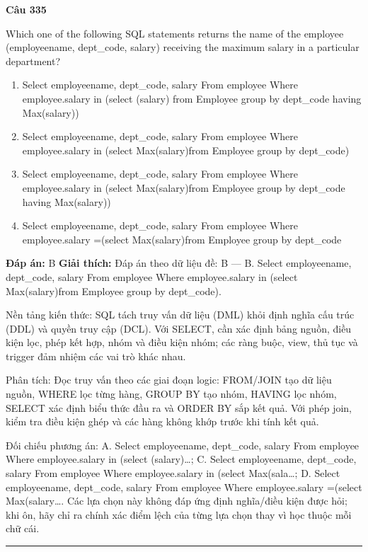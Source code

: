\documentclass[11pt,a4paper]{article}
\newenvironment{question}[1]{%
  \par\vspace{1em}\noindent\textbf{\large Câu #1}\par\vspace{0.4em}
}{%
  \par\vspace{1em}\hrule\vspace{0.6em}
}
\newenvironment{choices}{%
  \begin{enumerate}[label=\textbf{\Alph*.},leftmargin=2.2em,itemsep=2pt,topsep=3pt]
}{%
  \end{enumerate}
}
\newcommand{\choice}{\item}
\begin{document}
\begin{question}{335}
Which one of the following SQL statements returns the name of the employee (employeename, dept_code,
salary) receiving the maximum salary in a particular department?
\begin{choices}
\choice Select employeename, dept_code, salary From employee Where employee.salary in (select (salary) from Employee group by dept_code having Max(salary))
\choice Select employeename, dept_code, salary From employee Where employee.salary in (select Max(salary)from Employee group by dept_code)
\choice Select employeename, dept_code, salary From employee Where employee.salary in (select Max(salary)from Employee group by dept_code having Max(salary))
\choice Select employeename, dept_code, salary From employee Where employee.salary =(select Max(salary)from Employee group by dept_code
\end{choices}
\textbf{Đáp án:} B
\textbf{Giải thích:} Đáp án theo dữ liệu đề: B — B. Select employeename, dept_code, salary From employee Where employee.salary in (select Max(salary)from Employee group by dept_code).

Nền tảng kiến thức: SQL tách truy vấn dữ liệu (DML) khỏi định nghĩa cấu trúc (DDL) và quyền truy cập (DCL). Với SELECT, cần xác định bảng nguồn, điều kiện lọc, phép kết hợp, nhóm và điều kiện nhóm; các ràng buộc, view, thủ tục và trigger đảm nhiệm các vai trò khác nhau.

Phân tích: Đọc truy vấn theo các giai đoạn logic: FROM/JOIN tạo dữ liệu nguồn, WHERE lọc từng hàng, GROUP BY tạo nhóm, HAVING lọc nhóm, SELECT xác định biểu thức đầu ra và ORDER BY sắp kết quả. Với phép join, kiểm tra điều kiện ghép và các hàng không khớp trước khi tính kết quả.

Đối chiếu phương án: A. Select employeename, dept_code, salary From employee Where employee.salary in (select (salary)…; C. Select employeename, dept_code, salary From employee Where employee.salary in (select Max(sala…; D. Select employeename, dept_code, salary From employee Where employee.salary =(select Max(salary…. Các lựa chọn này không đáp ứng định nghĩa/điều kiện được hỏi; khi ôn, hãy chỉ ra chính xác điểm lệch của từng lựa chọn thay vì học thuộc mỗi chữ cái.
\end{question}
\end{document}
